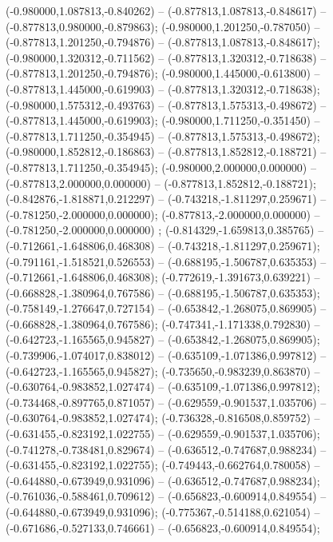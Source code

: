  (-0.980000,1.087813,-0.840262) -- (-0.877813,1.087813,-0.848617) -- (-0.877813,0.980000,-0.879863);
 (-0.980000,1.201250,-0.787050) -- (-0.877813,1.201250,-0.794876) -- (-0.877813,1.087813,-0.848617);
 (-0.980000,1.320312,-0.711562) -- (-0.877813,1.320312,-0.718638) -- (-0.877813,1.201250,-0.794876);
 (-0.980000,1.445000,-0.613800) -- (-0.877813,1.445000,-0.619903) -- (-0.877813,1.320312,-0.718638);
 (-0.980000,1.575312,-0.493763) -- (-0.877813,1.575313,-0.498672) -- (-0.877813,1.445000,-0.619903);
 (-0.980000,1.711250,-0.351450) -- (-0.877813,1.711250,-0.354945) -- (-0.877813,1.575313,-0.498672);
 (-0.980000,1.852812,-0.186863) -- (-0.877813,1.852812,-0.188721) -- (-0.877813,1.711250,-0.354945);
 (-0.980000,2.000000,0.000000) -- (-0.877813,2.000000,0.000000) -- (-0.877813,1.852812,-0.188721);
 (-0.842876,-1.818871,0.212297) -- (-0.743218,-1.811297,0.259671) -- (-0.781250,-2.000000,0.000000);
 (-0.877813,-2.000000,0.000000) -- (-0.781250,-2.000000,0.000000) ;
 (-0.814329,-1.659813,0.385765) -- (-0.712661,-1.648806,0.468308) -- (-0.743218,-1.811297,0.259671);
 (-0.791161,-1.518521,0.526553) -- (-0.688195,-1.506787,0.635353) -- (-0.712661,-1.648806,0.468308);
 (-0.772619,-1.391673,0.639221) -- (-0.668828,-1.380964,0.767586) -- (-0.688195,-1.506787,0.635353);
 (-0.758149,-1.276647,0.727154) -- (-0.653842,-1.268075,0.869905) -- (-0.668828,-1.380964,0.767586);
 (-0.747341,-1.171338,0.792830) -- (-0.642723,-1.165565,0.945827) -- (-0.653842,-1.268075,0.869905);
 (-0.739906,-1.074017,0.838012) -- (-0.635109,-1.071386,0.997812) -- (-0.642723,-1.165565,0.945827);
 (-0.735650,-0.983239,0.863870) -- (-0.630764,-0.983852,1.027474) -- (-0.635109,-1.071386,0.997812);
 (-0.734468,-0.897765,0.871057) -- (-0.629559,-0.901537,1.035706) -- (-0.630764,-0.983852,1.027474);
 (-0.736328,-0.816508,0.859752) -- (-0.631455,-0.823192,1.022755) -- (-0.629559,-0.901537,1.035706);
 (-0.741278,-0.738481,0.829674) -- (-0.636512,-0.747687,0.988234) -- (-0.631455,-0.823192,1.022755);
 (-0.749443,-0.662764,0.780058) -- (-0.644880,-0.673949,0.931096) -- (-0.636512,-0.747687,0.988234);
 (-0.761036,-0.588461,0.709612) -- (-0.656823,-0.600914,0.849554) -- (-0.644880,-0.673949,0.931096);
 (-0.775367,-0.514188,0.621054) -- (-0.671686,-0.527133,0.746661) -- (-0.656823,-0.600914,0.849554);
